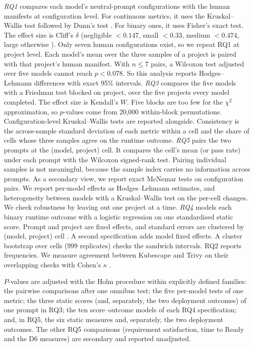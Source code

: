 \emph{RQ1} compares each model's neutral-prompt configurations with the human manifests at configuration level. For continuous metrics, it uses the Kruskal--Wallis test \citep{kruskal1952ranks} followed by Dunn's test \citep{dunn1964multiple}. For binary ones, it uses Fisher's exact test. The effect size is Cliff's $\delta$ \citep{cliff1993dominance} (negligible $<0.147$, small $<0.33$, medium $<0.474$, large otherwise \citep{romano2006appropriate}). Only seven human configurations exist, so we repeat RQ1 at project level. Each model's mean over the three samples of a project is paired with that project's human manifest. With $n\le7$ pairs, a Wilcoxon test adjusted over five models cannot reach $p<0.078$. So this analysis reports Hodges--Lehmann differences with exact 95\% intervals. \emph{RQ3} compares the five models with a Friedman test \citep{friedman1937ranks} blocked on project, over the five projects every model completed. The effect size is Kendall's $W$. Five blocks are too few for the $\chi^2$ approximation, so $p$-values come from 20,000 within-block permutations. Configuration-level Kruskal--Wallis tests are reported alongside. Consistency is the across-sample standard deviation of each metric within a cell and the share of cells whose three samples agree on the runtime outcome. \emph{RQ5} pairs the two prompts at the (model, project) cell. It compares the cell's mean (or pass rate) under each prompt with the Wilcoxon signed-rank test. Pairing individual samples is not meaningful, because the sample index carries no information across prompts. As a secondary view, we report exact McNemar tests \citep{mcnemar1947note} on configuration pairs. We report per-model effects as Hodges--Lehmann estimates, and heterogeneity between models with a Kruskal--Wallis test on the per-cell changes. We check robustness by leaving out one project at a time. \emph{RQ4} models each binary runtime outcome with a logistic regression on one standardised static score. Prompt and project are fixed effects, and standard errors are clustered by (model, project) cell \citep{cameron2015cluster}. A second specification adds model fixed effects. A cluster bootstrap over cells (999 replicates) checks the sandwich intervals. RQ2 reports frequencies. We measure agreement between Kubescape and Trivy on their overlapping checks with Cohen's $\kappa$ \citep{cohen1960kappa}.

$P$-values are adjusted with the Holm procedure \citep{holm1979simple} within explicitly defined families: the pairwise comparisons after one omnibus test; the five per-model tests of one metric; the three static scores (and, separately, the two deployment outcomes) of one prompt in RQ3; the ten score--outcome models of each RQ4 specification; and, in RQ5, the six static measures and, separately, the two deployment outcomes. The other RQ5 comparisons (requirement satisfaction, time to Ready and the D6 measures) are secondary and reported unadjusted.

